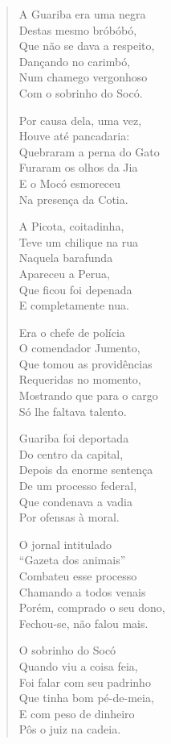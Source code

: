 \begin{verse}
A Guariba era uma negra\\
Destas mesmo bróbóbó,\\
Que não se dava a respeito,\\
Dançando no carimbó,\\
Num chamego vergonhoso\\
Com o sobrinho do Socó.

Por causa dela, uma vez,\\
Houve até pancadaria:\\
Quebraram a perna do Gato\\
Furaram os olhos da Jia\\
E o Mocó esmoreceu\\
Na presença da Cotia.

A Picota, coitadinha,\\
Teve um chilique na rua\\
Naquela barafunda\\
Apareceu a Perua,\\
Que ficou foi depenada\\
E completamente nua.
\pagebreak

Era o chefe de polícia\\
O comendador Jumento,\\
Que tomou as providências\\
Requeridas no momento,\\
Mostrando que para o cargo\\
Só lhe faltava talento.

Guariba foi deportada\\
Do centro da capital,\\
Depois da enorme sentença\\
De um processo federal,\\
Que condenava a vadia\\
Por ofensas à moral.

O jornal intitulado\\
“Gazeta dos animais”\\
Combateu esse processo\\
Chamando a todos venais\\
Porém, comprado o seu dono,\\
Fechou-se, não falou mais.

O sobrinho do Socó \\
Quando viu a coisa feia,\\
Foi falar com seu padrinho\\
Que tinha bom pé-de-meia,\\
E com peso de dinheiro\\
Pôs o juiz na cadeia.
\pagebreak


\end{verse}
